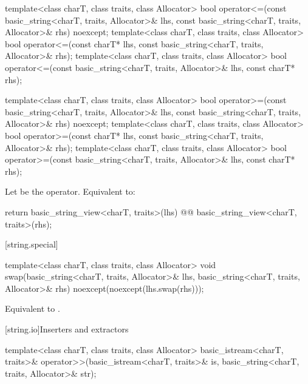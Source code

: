 \begin{itemdecl}
template<class charT, class traits, class Allocator>
  bool operator<=(const basic_string<charT, traits, Allocator>& lhs,
                  const basic_string<charT, traits, Allocator>& rhs) noexcept;
template<class charT, class traits, class Allocator>
  bool operator<=(const charT* lhs, const basic_string<charT, traits, Allocator>& rhs);
template<class charT, class traits, class Allocator>
  bool operator<=(const basic_string<charT, traits, Allocator>& lhs, const charT* rhs);

template<class charT, class traits, class Allocator>
  bool operator>=(const basic_string<charT, traits, Allocator>& lhs,
                  const basic_string<charT, traits, Allocator>& rhs) noexcept;
template<class charT, class traits, class Allocator>
  bool operator>=(const charT* lhs, const basic_string<charT, traits, Allocator>& rhs);
template<class charT, class traits, class Allocator>
  bool operator>=(const basic_string<charT, traits, Allocator>& lhs, const charT* rhs);
\end{itemdecl}
\begin{itemdescr}
\pnum
\effects Let  be the operator.
Equivalent to:
\begin{codeblock}
  return basic_string_view<charT, traits>(lhs) @@ basic_string_view<charT, traits>(rhs);
\end{codeblock}
\end{itemdescr}

[string.special]{}

%
\begin{itemdecl}
template<class charT, class traits, class Allocator>
  void swap(basic_string<charT, traits, Allocator>& lhs,
            basic_string<charT, traits, Allocator>& rhs)
    noexcept(noexcept(lhs.swap(rhs)));
\end{itemdecl}

\begin{itemdescr}
\pnum
\effects
Equivalent to .
\end{itemdescr}

[string.io]{Inserters and extractors}

%
\begin{itemdecl}
template<class charT, class traits, class Allocator>
  basic_istream<charT, traits>&
    operator>>(basic_istream<charT, traits>& is, basic_string<charT, traits, Allocator>& str);
\end{itemdecl}

